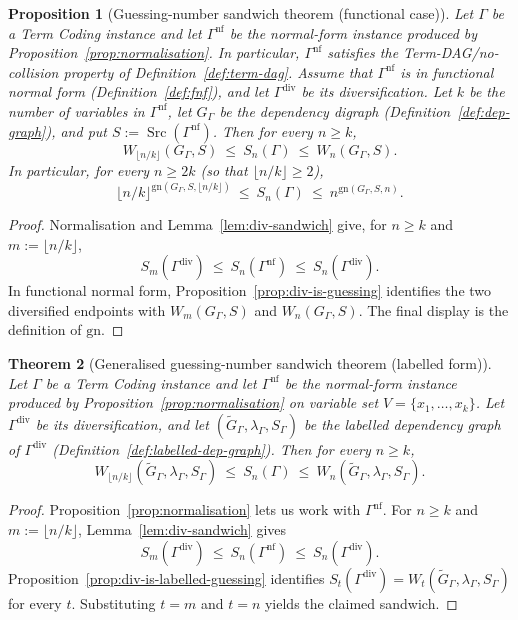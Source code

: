 \documentclass[11pt]{article}
\theoremstyle{plain}
\newtheorem{theorem}{Theorem}[section]
\newtheorem{proposition}[theorem]{Proposition}
\theoremstyle{definition}
\theoremstyle{definition}
\theoremstyle{remark}
\newcommand{\Sn}{S_n}
\newcommand{\gn}{\mathrm{gn}}
\newcommand{\Src}{\operatorname{Src}}
\begin{document}
\begin{proposition}[Guessing-number sandwich theorem (functional case)]
\label{prop:sandwich-unlabelled}
Let $\Gamma$ be a Term Coding instance and let $\Gamma^{\mathrm{nf}}$ be the normal-form instance produced by
Proposition~\ref{prop:normalisation}.
In particular, $\Gamma^{\mathrm{nf}}$ satisfies the Term-DAG/no-collision property of Definition~\ref{def:term-dag}.
Assume that $\Gamma^{\mathrm{nf}}$ is in functional normal form (Definition~\ref{def:fnf}), and let
$\Gamma^{\mathrm{div}}$ be its diversification.
Let $k$ be the number of variables in $\Gamma^{\mathrm{nf}}$, let $G_\Gamma$ be the dependency digraph
(Definition~\ref{def:dep-graph}), and put $S:=\Src(\Gamma^{\mathrm{nf}})$.
Then for every $n\ge k$,
\[
  W_{\lfloor n/k\rfloor}(G_\Gamma,S)
  \ \le\ \Sn(\Gamma)
  \ \le\ W_n(G_\Gamma,S).
\]
In particular, for every $n\ge 2k$ (so that $\lfloor n/k\rfloor\ge 2$),
\[
  \lfloor n/k\rfloor^{\gn(G_\Gamma,S,\lfloor n/k\rfloor)}
  \ \le\ \Sn(\Gamma)
  \ \le\ n^{\gn(G_\Gamma,S,n)}.
\]
\end{proposition}

\begin{proof}
Normalisation and Lemma~\ref{lem:div-sandwich} give, for $n\ge k$ and
$m:=\lfloor n/k\rfloor$,
\[
  S_m(\Gamma^{\mathrm{div}})\ \le\ \Sn(\Gamma^{\mathrm{nf}})
  \ \le\ \Sn(\Gamma^{\mathrm{div}}).
\]
In functional normal form, Proposition~\ref{prop:div-is-guessing} identifies the two
diversified endpoints with $W_m(G_\Gamma,S)$ and $W_n(G_\Gamma,S)$. The final display is
the definition of $\gn$.
\end{proof}

\begin{theorem}[Generalised guessing-number sandwich theorem (labelled form)]
\label{thm:sandwich-labelled}
Let $\Gamma$ be a Term Coding instance and let $\Gamma^{\mathrm{nf}}$ be the normal-form instance produced by
Proposition~\ref{prop:normalisation} on variable set $V=\{x_1,\dots,x_k\}$.
Let $\Gamma^{\mathrm{div}}$ be its diversification, and let
$(\widetilde G_{\Gamma},\lambda_{\Gamma},S_{\Gamma})$ be the labelled dependency graph of
$\Gamma^{\mathrm{div}}$ (Definition~\ref{def:labelled-dep-graph}).
Then for every $n\ge k$,
\[
  W_{\lfloor n/k\rfloor}(\widetilde G_{\Gamma},\lambda_{\Gamma},S_{\Gamma})
  \ \le\ \Sn(\Gamma)
  \ \le\ W_n(\widetilde G_{\Gamma},\lambda_{\Gamma},S_{\Gamma}).
\]
\end{theorem}

\begin{proof}
Proposition~\ref{prop:normalisation} lets us work with $\Gamma^{\mathrm{nf}}$.
For $n\ge k$ and $m:=\lfloor n/k\rfloor$, Lemma~\ref{lem:div-sandwich} gives
\[
  S_m(\Gamma^{\mathrm{div}})\ \le\ \Sn(\Gamma^{\mathrm{nf}})\ \le\ \Sn(\Gamma^{\mathrm{div}}).
\]
Proposition~\ref{prop:div-is-labelled-guessing} identifies
$S_t(\Gamma^{\mathrm{div}})=W_t(\widetilde G_{\Gamma},\lambda_{\Gamma},S_{\Gamma})$ for every $t$.
Substituting $t=m$ and $t=n$ yields the claimed sandwich.
\end{proof}
\end{document}
